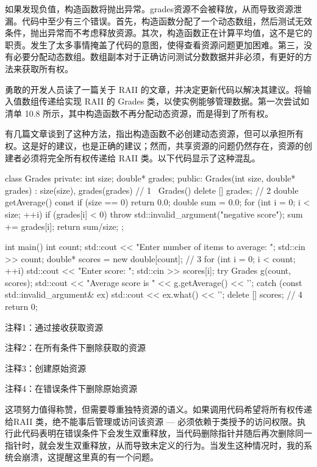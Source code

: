 
如果发现负值，构造函数将抛出异常。grades资源不会被释放，从而导致资源泄漏。代码中至少有三个错误。首先，构造函数分配了一个动态数组，然后测试无效条件，抛出异常而不考虑释放资源。其次，构造函数正在计算平均值，这不是它的职责。发生了太多事情掩盖了代码的意图，使得查看资源问题更加困难。第三，没有必要分配动态数组。数组副本对于正确访问测试分数数据并非必须，有更好的方法来获取所有权。

勇敢的开发人员读了一篇关于 RAII 的文章，并决定更新代码以解决其建议。将输入值数组传递给实现 RAII 的 Grades 类，以使实例能够管理数据。第一次尝试如清单 10.8 所示，其中构造函数不再分配动态资源，而是得到了所有权。

有几篇文章谈到了这种方法，指出构造函数不必创建动态资源，但可以承担所有权。这是好的建议，也是正确的建议；然而，共享资源的问题仍然存在，资源的创建者必须将完全所有权传递给 RAII 类。以下代码显示了这种混乱。


\begin{cpp}
class Grades {
private:
  int size;
  double* grades;
public:
  Grades(int size, double* grades) : size(size),
  grades(grades) {} // 1
  ~Grades() { delete [] grades; } // 2
  double getAverage() const {
    if (size == 0)
      return 0.0;
    double sum = 0.0;
    for (int i = 0; i < size; ++i) {
      if (grades[i] < 0)
        throw std::invalid_argument("negative score");
      sum += grades[i];
    }
    return sum/size;
  }
};

int main() {
  int count;
  std::cout << "Enter number of items to average: ";
  std::cin >> count;
  double* scores = new double[count]; // 3
  for (int i = 0; i < count; ++i) {
    std::cout << "Enter score: ";
    std::cin >> scores[i];
  }
  try {
    Grades g(count, scores);
    std::cout << "Average score is " << g.getAverage() << '\n';
  } catch (const std::invalid_argument& ex) {
    std::cout << ex.what() << '\n';
    delete [] scores; // 4
  }
  return 0;
}
\end{cpp}

{\footnotesize
注释1：通过接收获取资源

注释2：在所有条件下删除获取的资源

注释3：创建原始资源

注释4：在错误条件下删除原始资源
}

这项努力值得称赞，但需要尊重独特资源的语义。如果调用代码希望将所有权传递给RAII 类，绝不能事后管理或访问该资源 — 必须依赖于类授予的访问权限。执行此代码表明在错误条件下会发生双重释放，当代码删除指针并随后再次删除同一指针时，就会发生双重释放，从而导致未定义的行为。当发生这种情况时，我的系统会崩溃，这提醒这里真的有一个问题。

